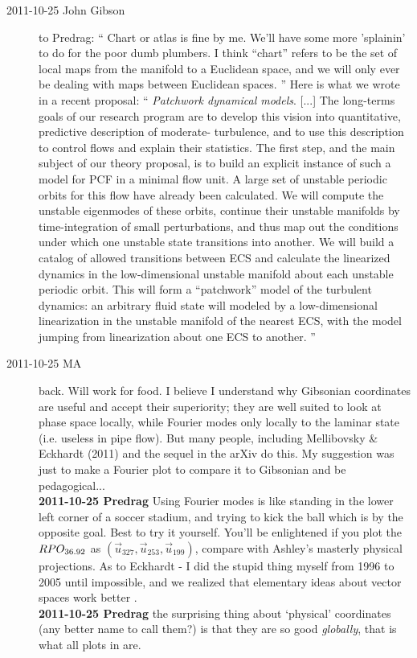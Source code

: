 \begin{description}
\item[2011-10-25 John Gibson~~]  to Predrag: ``         \toCB
Chart or atlas is fine by me. We'll have some more 'splainin' to do for
the poor dumb plumbers. I think ``chart'' refers to be the set of
local maps from the manifold to a Euclidean space, and we will only ever
be dealing with maps between Euclidean spaces.
'' Here is what we wrote in a recent proposal: ``
{\em Patchwork dynamical models}. [...]
The long-terms goals of our research program are to develop this vision into
quantitative, predictive description of moderate-{\Reynolds} turbulence, and
to use this description to control flows and explain their statistics. The
first step, and the main subject of our theory proposal, is to build an explicit
instance of such a model for PCF in a minimal flow unit. A large set of
unstable periodic orbits for this flow have already been calculated.
We will compute the unstable eigenmodes of these orbits, continue their
unstable manifolds by time-integration of small perturbations, and thus map
out the conditions under which one unstable state transitions into another.
We will build a catalog of allowed transitions between ECS and calculate
the linearized dynamics in the low-dimensional unstable manifold about each
unstable periodic orbit. This will form a ``patchwork'' model of the turbulent
dynamics: an arbitrary fluid state will modeled by a low-dimensional
linearization in the unstable manifold of the nearest ECS, with the model
jumping from linearization about one ECS to another.
''


\item[2011-10-25 MA~~] back. Will work for food. I believe I understand
why Gibsonian coordinates are useful and accept their superiority; they
are well suited to look at phase space locally, while Fourier modes only
locally to the laminar state (i.e. useless in pipe flow). But many
people, including Mellibovsky \& Eckhardt (2011) and the sequel in the
arXiv do this. My suggestion was just to make a Fourier plot to compare
it to Gibsonian and be pedagogical...
\\
{\bf 2011-10-25 Predrag} Using Fourier modes is like standing in the
lower left corner of a soccer stadium, and trying to kick the ball which
is by the opposite goal. Best to try it yourself. You'll be enlightened
if you plot the $RPO_{36.92}$ as
$(\vec{u}_{327},\vec{u}_{253},\vec{u}_{199})$, compare with Ashley's
masterly physical projections. As to Eckhardt - I did the stupid thing
myself from 1996 to 2005  until impossible, and we
realized that elementary ideas about vector spaces work better
.
\\
{\bf 2011-10-25 Predrag} the surprising thing about `physical' coordinates
(any better name to call them?)
is that they are so good \emph{globally}, that is what all plots in
 are.



\end{description}
